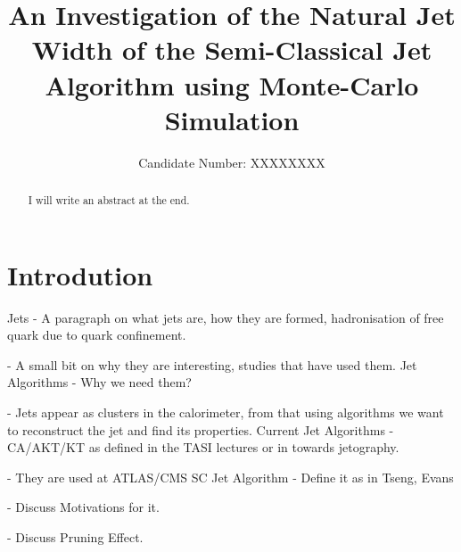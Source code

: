 \documentclass[a4paper,12pt, onecolumn]{article}
\author{Candidate Number: XXXXXXXX}
\title{An Investigation of the Natural Jet Width of the Semi-Classical Jet Algorithm using Monte-Carlo Simulation}
\begin{document}
       \maketitle
     	
	\def\abstractname{{\ Abstract}}
	\begin{abstract}
	I will write an abstract at the end. 
	\newline\newline
	\end{abstract}
	

	\section{Introdution}
	
	Jets  -  A paragraph on what jets are, how they are formed, hadronisation of free quark due to quark confinement. 
   
	\hspace{1 mm}
	 - A small bit on why they are interesting, studies that have used them. 
	\newline	\newline		
	Jet Algorithms - Why we need them?

	- Jets appear as clusters in the calorimeter, from that using algorithms we want to reconstruct the jet and find its properties.
	\newline \newline
	Current Jet Algorithms - CA/AKT/KT as defined in the TASI lectures or in towards jetography.

					    - They are used at ATLAS/CMS
	\newline \newline
	SC Jet Algorithm - Define it as in Tseng, Evans \cite{Tseng}

	- Discuss Motivations for it.

	- Discuss Pruning Effect.
	\newline \newline

	
        
        


       
\end{document}
